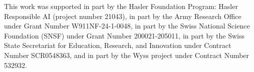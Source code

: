 This work was supported in part by the Hasler Foundation Program: Hasler Responsible AI (project number 21043), in part by the Army Research Office under Grant Number W911NF-24-1-0048, in part by the Swiss National Science Foundation (SNSF) under Grant Number 200021-205011, in part by the Swiss State Secretariat for Education, Research, and Innovation under Contract Number SCR0548363, and in part by the Wyss project under Contract Number 532932.
